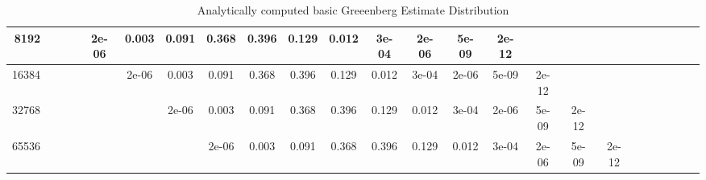 \begin{appendices}
\begin{sidewaystable}
{\begin{tabular}{r|ccccccccccccccccccccccc}
8192 &&&&2e-06 &0.003 &0.091 &0.368 &0.396 &0.129 &0.012 &3e-04 &2e-06 &5e-09 &2e-12 &&&\\\hline

16384 &&&&&2e-06 &0.003 &0.091 &0.368 &0.396 &0.129 &0.012 &3e-04 &2e-06 &5e-09 &2e-12 &&\\\hline

32768 &&&&&&2e-06 &0.003 &0.091 &0.368 &0.396 &0.129 &0.012 &3e-04 &2e-06 &5e-09 &2e-12 &\\\hline

65536 &&&&&&&2e-06 &0.003 &0.091 &0.368 &0.396 &0.129 &0.012 &3e-04 &2e-06 &5e-09 &2e-12\\

\bottomrule
\end{tabular}
}
\caption{Analytically computed basic Greeenberg Estimate Distribution}
\label{basic-greenberg-stop-probabilities}

\end{sidewaystable}

\end{appendices}
